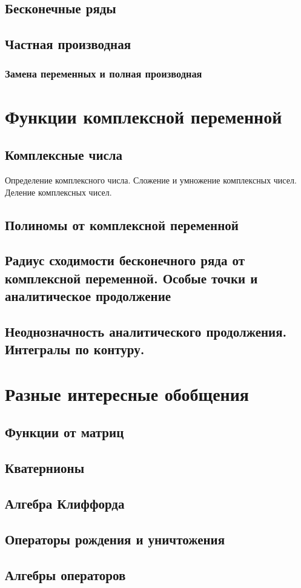 \documentclass{article}
\begin{document}
\subsection{Бесконечные ряды}
\subsection{Частная производная}
\subsubsection{Замена переменных и полная производная}
\section{Функции комплексной переменной}
\subsection{Комплексные числа}
Определение комплексного числа. Сложение и умножение комплексных чисел. Деление комплексных чисел.
\subsection{Полиномы от комплексной переменной}
\subsection{Радиус сходимости бесконечного ряда от комплексной переменной. Особые точки и аналитическое продолжение}
\subsection{Неоднозначность аналитического продолжения. Интегралы по контуру.}

\section{Разные интересные обобщения}
\subsection{Функции от матриц}
\subsection{Кватернионы}
\subsection{Алгебра Клиффорда}
\subsection{Операторы рождения и уничтожения}
\subsection{Алгебры операторов}
\end{document}
